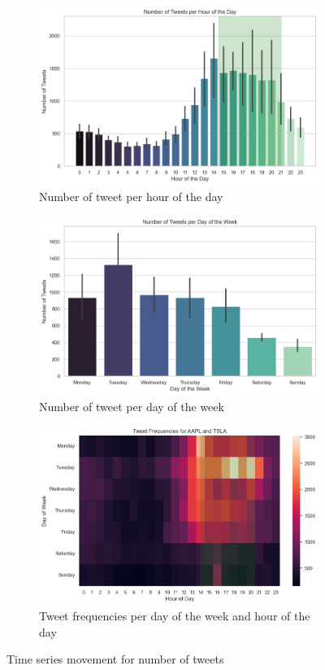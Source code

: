\documentclass[12pt]{article}
\begin{document}
\begin{figure}[h!]
    \centering
    \begin{subfigure}{.4\textwidth}
        \centering
        \includegraphics[width=.7\textwidth]{P1.6.3.png}
        \caption{Number of tweet per hour of the day}
        \label{fig:1.6.3}
    \end{subfigure}%
    \begin{subfigure}{.4\textwidth}
        \centering
        \includegraphics[width=.7\textwidth]{P1.6.2.png}
        \caption{Number of tweet per day of the week}
        \label{fig:1.6.2}
    \end{subfigure}
    \begin{subfigure}{.7\textwidth}
        \centering
        \includegraphics[width=.7\textwidth]{P1.6.1.png}
        \caption{Tweet frequencies per day of the week and hour of the day}
        \label{fig:1.6.1}
    \end{subfigure}
    \caption{Time series movement for number of tweets}
\end{figure}
\end{document}
